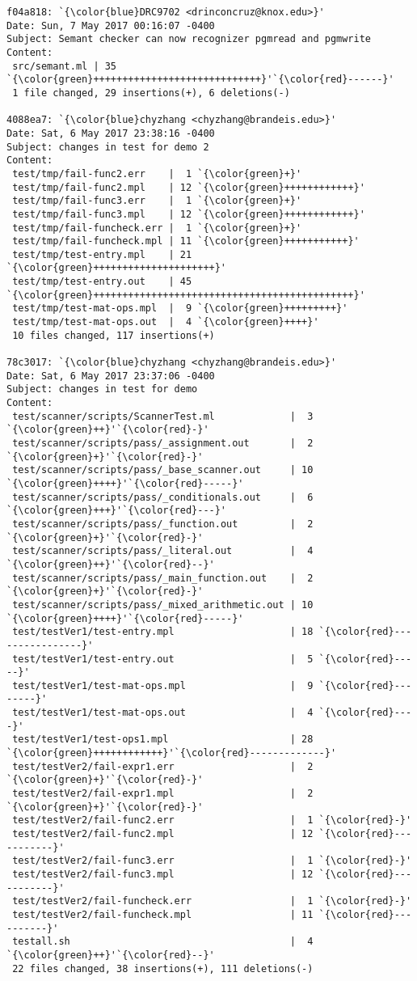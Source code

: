 \begin{lstlisting}
f04a818: `{\color{blue}DRC9702 <drinconcruz@knox.edu>}'
Date: Sun, 7 May 2017 00:16:07 -0400
Subject: Semant checker can now recognizer pgmread and pgmwrite
Content: 
 src/semant.ml | 35 `{\color{green}+++++++++++++++++++++++++++++}'`{\color{red}------}'
 1 file changed, 29 insertions(+), 6 deletions(-)

4088ea7: `{\color{blue}chyzhang <chyzhang@brandeis.edu>}'
Date: Sat, 6 May 2017 23:38:16 -0400
Subject: changes in test for demo 2
Content: 
 test/tmp/fail-func2.err    |  1 `{\color{green}+}'
 test/tmp/fail-func2.mpl    | 12 `{\color{green}++++++++++++}'
 test/tmp/fail-func3.err    |  1 `{\color{green}+}'
 test/tmp/fail-func3.mpl    | 12 `{\color{green}++++++++++++}'
 test/tmp/fail-funcheck.err |  1 `{\color{green}+}'
 test/tmp/fail-funcheck.mpl | 11 `{\color{green}+++++++++++}'
 test/tmp/test-entry.mpl    | 21 `{\color{green}+++++++++++++++++++++}'
 test/tmp/test-entry.out    | 45 `{\color{green}+++++++++++++++++++++++++++++++++++++++++++++}'
 test/tmp/test-mat-ops.mpl  |  9 `{\color{green}+++++++++}'
 test/tmp/test-mat-ops.out  |  4 `{\color{green}++++}'
 10 files changed, 117 insertions(+)

78c3017: `{\color{blue}chyzhang <chyzhang@brandeis.edu>}'
Date: Sat, 6 May 2017 23:37:06 -0400
Subject: changes in test for demo
Content: 
 test/scanner/scripts/ScannerTest.ml             |  3 `{\color{green}++}'`{\color{red}-}'
 test/scanner/scripts/pass/_assignment.out       |  2 `{\color{green}+}'`{\color{red}-}'
 test/scanner/scripts/pass/_base_scanner.out     | 10 `{\color{green}++++}'`{\color{red}-----}'
 test/scanner/scripts/pass/_conditionals.out     |  6 `{\color{green}+++}'`{\color{red}---}'
 test/scanner/scripts/pass/_function.out         |  2 `{\color{green}+}'`{\color{red}-}'
 test/scanner/scripts/pass/_literal.out          |  4 `{\color{green}++}'`{\color{red}--}'
 test/scanner/scripts/pass/_main_function.out    |  2 `{\color{green}+}'`{\color{red}-}'
 test/scanner/scripts/pass/_mixed_arithmetic.out | 10 `{\color{green}++++}'`{\color{red}-----}'
 test/testVer1/test-entry.mpl                    | 18 `{\color{red}----------------}'
 test/testVer1/test-entry.out                    |  5 `{\color{red}-----}'
 test/testVer1/test-mat-ops.mpl                  |  9 `{\color{red}--------}'
 test/testVer1/test-mat-ops.out                  |  4 `{\color{red}----}'
 test/testVer1/test-ops1.mpl                     | 28 `{\color{green}++++++++++++}'`{\color{red}-------------}'
 test/testVer2/fail-expr1.err                    |  2 `{\color{green}+}'`{\color{red}-}'
 test/testVer2/fail-expr1.mpl                    |  2 `{\color{green}+}'`{\color{red}-}'
 test/testVer2/fail-func2.err                    |  1 `{\color{red}-}'
 test/testVer2/fail-func2.mpl                    | 12 `{\color{red}-----------}'
 test/testVer2/fail-func3.err                    |  1 `{\color{red}-}'
 test/testVer2/fail-func3.mpl                    | 12 `{\color{red}-----------}'
 test/testVer2/fail-funcheck.err                 |  1 `{\color{red}-}'
 test/testVer2/fail-funcheck.mpl                 | 11 `{\color{red}----------}'
 testall.sh                                      |  4 `{\color{green}++}'`{\color{red}--}'
 22 files changed, 38 insertions(+), 111 deletions(-)


\end{lstlisting}
